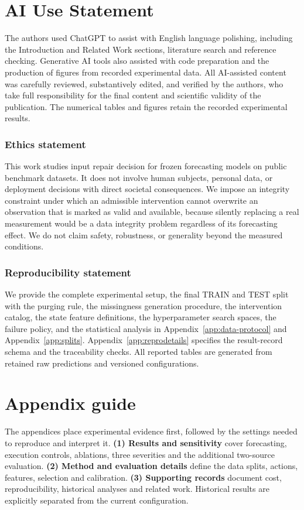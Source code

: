 \documentclass{article}
\begin{document}
\section*{AI Use Statement}
\label{sec:ai-statement}
The authors used ChatGPT to assist with English language polishing, including the
Introduction and Related Work sections, literature search and reference checking.
Generative AI tools also assisted with code preparation and the production of figures
from recorded experimental data. All AI-assisted content was carefully reviewed,
substantively edited, and verified by the authors, who take full responsibility for
the final content and scientific validity of the publication. The numerical tables
and figures retain the recorded experimental results.

\subsubsection*{Ethics statement}
This work studies input repair decision for frozen forecasting models on public benchmark datasets.
It does not involve human subjects, personal data, or deployment decisions with direct
societal consequences. We impose an integrity constraint under which an admissible
intervention cannot overwrite an observation that is marked as valid and available, because
silently replacing a real measurement would be a data integrity problem regardless of its
forecasting effect. We do not claim safety, robustness, or generality beyond the measured
conditions.

\subsubsection*{Reproducibility statement}
We provide the complete experimental setup, the final TRAIN and TEST split with the
purging rule, the missingness generation procedure, the intervention catalog, the state
feature definitions, the hyperparameter search spaces, the failure policy, and the statistical
analysis in Appendix~\ref{app:data-protocol} and Appendix~\ref{app:splits}.
Appendix~\ref{app:reprodetails} specifies the result-record schema and the traceability checks.
All reported tables are generated from retained raw predictions and versioned configurations.




\appendix

\newpage
\section*{Appendix guide}
The appendices place experimental evidence first, followed by the settings needed to
reproduce and interpret it. \textbf{(1) Results and sensitivity} cover forecasting,
execution controls, ablations, three severities and the additional two-source evaluation.
\textbf{(2) Method and evaluation details} define the data splits, actions, features,
selection and calibration. \textbf{(3) Supporting records} document cost, reproducibility,
historical analyses and related work. Historical results are explicitly separated from the
current configuration.
\end{document}
